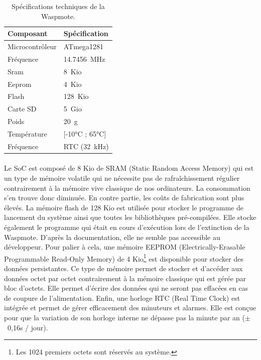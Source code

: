         \begin{table}[h]
            \centering
            \begin{tabular}{l | l}
                \bfseries{Composant}    & \bfseries{Spécification}\tabularnewline\hline
                Microcontrôleur         & ATmega1281\tabularnewline
                Fréquence               & 14.7456~MHz\tabularnewline
                Sram                    & 8~Kio\tabularnewline
                Eeprom                  & 4~Kio\tabularnewline
                Flash                   & 128~Kio\tabularnewline
                Carte SD                & 5~Gio\tabularnewline
                Poids                   & 20~g\tabularnewline
                Température             & [-10°C ; 65°C]\tabularnewline
                Fréquence               & RTC (32~kHz)
            \end{tabular}
            \caption{Spécifications techniques de la Waspmote.}
            \label{tab:spec}
        \end{table}

        \paragraph{}Le SoC est composé de 8 Kio de SRAM (Static Random Access Memory) qui est un type de mémoire volatile qui ne nécessite pas de rafraîchissement régulier contrairement à la mémoire vive classique de nos ordinateurs. La consommation s'en trouve donc diminuée. En contre partie, les coûts de fabrication sont plus élevés. La mémoire flash de 128 Kio est utilisée pour stocker le programme de lancement du système ainsi que toutes les bibliothèques pré-compilées. Elle stocke également le programme qui était en cours d'exécution lors de l'extinction de la Waspmote. D'après la documentation, elle ne semble pas accessible au développeur. Pour palier à cela, une mémoire EEPROM (Electrically-Erasable Programmable Read-Only Memory) de 4 Kio\footnote{Les 1024 premiers octets sont réservés au système.} est disponible pour stocker des données persistantes. Ce type de mémoire permet de stocker et d'accéder aux données octet par octet contrairement à la mémoire classique qui est gérée par bloc d'octets. Elle permet d'écrire des données qui ne seront pas effacées en cas de coupure de l'alimentation. Enfin, une horloge RTC (Real Time Clock) est intégrée et permet de gérer efficacement des minuteurs et alarmes. Elle est conçue pour que la variation de son horloge interne ne dépasse pas la minute par an ($\pm$~0,16s / jour). 
        
